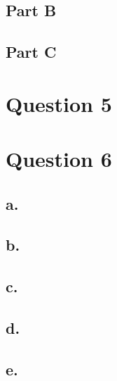 \documentclass{article}
\theoremstyle{mytheoremstyle}
\theoremstyle{mytheoremstyle}
\theoremstyle{myproblemstyle}
\begin{document}
    \subsection*{Part B}
    \subsection*{Part C}
    \section*{Question 5}
    \section*{Question 6}
    \subsection*{a.}
    \subsection*{b.}
    \subsection*{c.}
    \subsection*{d.}
    \subsection*{e.}
\end{document}
